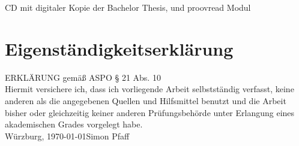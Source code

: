 \documentclass{scrartcl}
\begin{document}
CD mit digitaler Kopie der Bachelor Thesis, und proovread Modul  
\clearpage

\section*{Eigenständigkeitserklärung}
ERKLÄRUNG gemäß ASPO § 21 Abs. 10\\[10mm]
Hiermit versichere ich, dass ich vorliegende Arbeit selbstständig verfasst, keine anderen als
die angegebenen Quellen und Hilfsmittel benutzt und die Arbeit bisher oder gleichzeitig
keiner anderen Prüfungsbehörde unter Erlangung eines akademischen Grades
vorgelegt habe.\\[20mm]
Würzburg, \today \hfill Simon Pfaff
\clearpage
\end{document}
